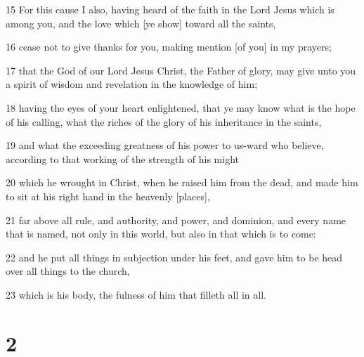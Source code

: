 \par 15 For this cause I also, having heard of the faith in the Lord Jesus which is among you, and the love which [ye show] toward all the saints,
\par 16 cease not to give thanks for you, making mention [of you] in my prayers;
\par 17 that the God of our Lord Jesus Christ, the Father of glory, may give unto you a spirit of wisdom and revelation in the knowledge of him;
\par 18 having the eyes of your heart enlightened, that ye may know what is the hope of his calling, what the riches of the glory of his inheritance in the saints,
\par 19 and what the exceeding greatness of his power to us-ward who believe, according to that working of the strength of his might
\par 20 which he wrought in Christ, when he raised him from the dead, and made him to sit at his right hand in the heavenly [places],
\par 21 far above all rule, and authority, and power, and dominion, and every name that is named, not only in this world, but also in that which is to come:
\par 22 and he put all things in subjection under his feet, and gave him to be head over all things to the church,
\par 23 which is his body, the fulness of him that filleth all in all.

\chapter{2}

